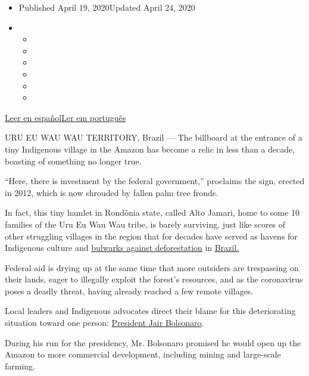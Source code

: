\begin{itemize}
\item
  Published April 19, 2020Updated April 24, 2020
\item
  \begin{itemize}
  \item
  \item
  \item
  \item
  \item
  \item
  \end{itemize}
\end{itemize}

\href{https://www.nytimes3xbfgragh.onion/es/2020/04/19/espanol/america-latina/bolsonaro-brasil-amazonia-indigena.html}{Leer
en
español}\href{https://www.nytimes3xbfgragh.onion/pt/2020/04/19/world/americas/bolsonaro-brasil-amazonia-indigenas-funai.html}{Ler
em português}

URU EU WAU WAU TERRITORY, Brazil --- The billboard at the entrance of a
tiny Indigenous village in the Amazon has become a relic in less than a
decade, boasting of something no longer true.

``Here, there is investment by the federal government,'' proclaims the
sign, erected in 2012, which is now shrouded by fallen palm tree fronds.

In fact, this tiny hamlet in Rondônia state, called Alto Jamari, home to
some 10 families of the Uru Eu Wau Wau tribe, is barely surviving, just
like scores of other struggling villages in the region that for decades
have served as havens for Indigenous culture and
\href{http://www.edf.org/sites/default/files/tropical-forest-carbon-in-indigenous-territories-a-global-analysis.pdf}{bulwarks
against deforestation} in
\href{https://www.nytimes3xbfgragh.onion/2020/04/24/world/americas/brazil-bolsonaro-moro.html}{Brazil.}

Federal aid is drying up at the same time that more outsiders are
trespassing on their lands, eager to illegally exploit the forest's
resources, and as the coronavirus poses a deadly threat, having already
reached a few remote villages.

Local leaders and Indigenous advocates direct their blame for this
deteriorating situation toward one person:
\href{https://www.nytimes3xbfgragh.onion/2020/04/24/world/americas/brazil-bolsonaro-moro.html}{President
Jair Bolsonaro}.

During his run for the presidency, Mr. Bolsonaro promised he would open
up the Amazon to more commercial development, including mining and
large-scale farming.

